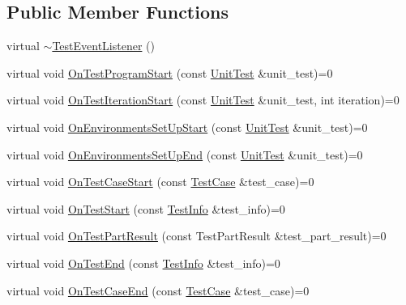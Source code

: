 \subsection*{Public Member Functions}
\begin{DoxyCompactItemize}
\item 
virtual \mbox{\hyperlink{classtesting_1_1TestEventListener_a4512d19e7a108ec4926239ec1ea85d63}{$\sim$\+Test\+Event\+Listener}} ()
\item 
virtual void \mbox{\hyperlink{classtesting_1_1TestEventListener_a5f6c84f39851e8a603a2d2e10063816b}{On\+Test\+Program\+Start}} (const \mbox{\hyperlink{classtesting_1_1UnitTest}{Unit\+Test}} \&unit\+\_\+test)=0
\item 
virtual void \mbox{\hyperlink{classtesting_1_1TestEventListener_a60cc09b7907cb329d152eb5e7133bdeb}{On\+Test\+Iteration\+Start}} (const \mbox{\hyperlink{classtesting_1_1UnitTest}{Unit\+Test}} \&unit\+\_\+test, int iteration)=0
\item 
virtual void \mbox{\hyperlink{classtesting_1_1TestEventListener_aa6502e534919605be45f26a6daf9a40c}{On\+Environments\+Set\+Up\+Start}} (const \mbox{\hyperlink{classtesting_1_1UnitTest}{Unit\+Test}} \&unit\+\_\+test)=0
\item 
virtual void \mbox{\hyperlink{classtesting_1_1TestEventListener_aaa1021d75f5dbf3f05c829c1cc520341}{On\+Environments\+Set\+Up\+End}} (const \mbox{\hyperlink{classtesting_1_1UnitTest}{Unit\+Test}} \&unit\+\_\+test)=0
\item 
virtual void \mbox{\hyperlink{classtesting_1_1TestEventListener_ab4ed885d63f5bbff8076c1329b3dfe36}{On\+Test\+Case\+Start}} (const \mbox{\hyperlink{classtesting_1_1TestCase}{Test\+Case}} \&test\+\_\+case)=0
\item 
virtual void \mbox{\hyperlink{classtesting_1_1TestEventListener_ab4f6a0ca16ae75daf385b3b5914e1048}{On\+Test\+Start}} (const \mbox{\hyperlink{classtesting_1_1TestInfo}{Test\+Info}} \&test\+\_\+info)=0
\item 
virtual void \mbox{\hyperlink{classtesting_1_1TestEventListener_a054f8705c883fa120b91473aff38f2ee}{On\+Test\+Part\+Result}} (const Test\+Part\+Result \&test\+\_\+part\+\_\+result)=0
\item 
virtual void \mbox{\hyperlink{classtesting_1_1TestEventListener_abb1c44525ef038500608b5dc2f17099b}{On\+Test\+End}} (const \mbox{\hyperlink{classtesting_1_1TestInfo}{Test\+Info}} \&test\+\_\+info)=0
\item 
virtual void \mbox{\hyperlink{classtesting_1_1TestEventListener_ae61985e2ef76ac78379b077be57a9c36}{On\+Test\+Case\+End}} (const \mbox{\hyperlink{classtesting_1_1TestCase}{Test\+Case}} \&test\+\_\+case)=0

\end{DoxyCompactItemize}

